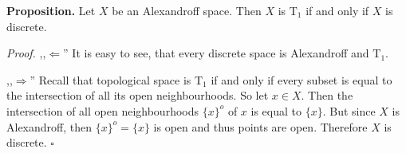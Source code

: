 \documentclass[12pt]{article}
\begin{document}
\textbf{Proposition.} Let $X$ be an Alexandroff space. Then $X$ is $\mathrm{T}_{1}$ if and only if $X$ is discrete.

\textit{Proof.} ,,$\Leftarrow$'' It is easy to see, that every discrete space is Alexandroff and $\mathrm{T}_{1}$.

,,$\Rightarrow$'' Recall that topological space is $\mathrm{T}_1$ if and only if every subset is equal to the intersection of all its open neighbourhoods. So let $x\in X$. Then the intersection of all open neighbourhoods $\{x\}^{o}$ of $x$ is equal to $\{x\}$. But since $X$ is Alexandroff, then $\{x\}^{o}=\{x\}$ is open and thus points are open. Therefore $X$ is discrete. $\square$
\end{document}
